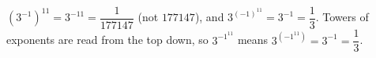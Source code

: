 $\left(3^{-1}\right)^{11}=3^{-11}=\dfrac1{177147}$ (not $177147$), and $3^{(-1)^{11}}=3^{-1}=\dfrac13$. Towers of exponents are read from the top down, so $3^{-1^{11}}$ means $3^{\left(-1^{11}\right)}=3^{-1}=\boxed{\dfrac13}$.

